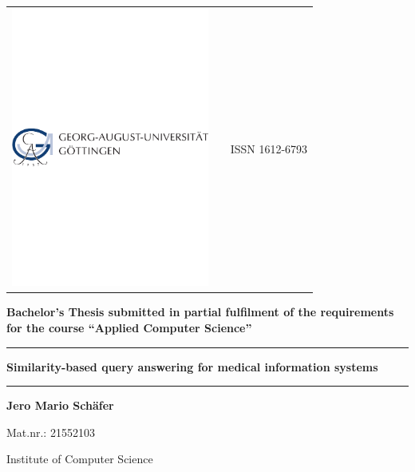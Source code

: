 
\newcommand{\Rule}{\rule{\textwidth}{1mm}}

\begin{titlepage}
    \singlespacing

    \normalsize
    \begin{tabularx}{\textwidth}{lXr}
        \includegraphics[width=6.5cm]{img/ugo-logo.pdf} & & ISSN 1612-6793\\
    \end{tabularx}

    \vspace{1cm}
    
    \centering
    \sffamily\bfseries\LARGE Bachelor's Thesis
    submitted in partial fulfilment of the
    requirements for the course ``Applied Computer Science''

    \vspace{1mm}

    \Rule\vspace{5mm}
    \sffamily\bfseries\Huge
        Similarity-based query answering for medical information systems
    \vspace{1mm}\Rule

    \vspace{1.5cm}

    \sffamily\bfseries\Large Jero Mario Schäfer\par Mat.nr.: 21552103\par
    \vspace{0.5cm}
    Institute of Computer Science

    \vspace{1.5cm}


\end{titlepage}
